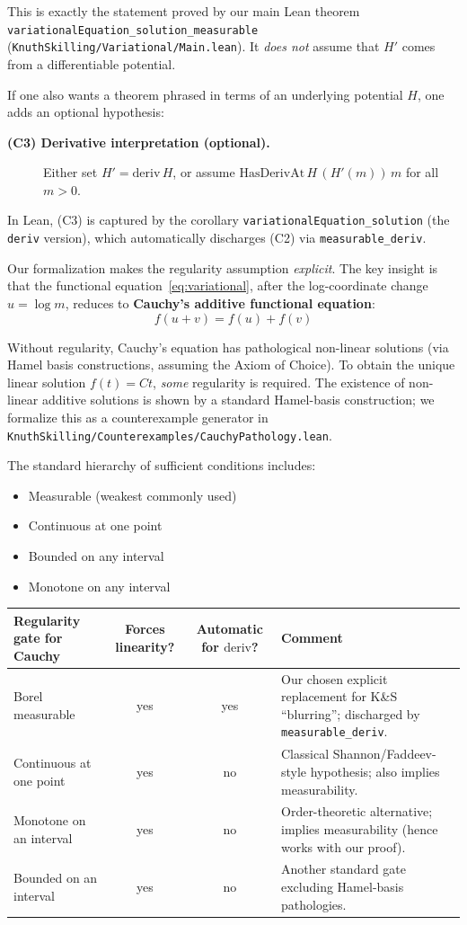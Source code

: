 \documentclass[11pt]{article}
\theoremstyle{definition}
\theoremstyle{remark}
\begin{document}
This is exactly the statement proved by our main Lean theorem
\texttt{variationalEquation\_solution\_measurable}
(\texttt{KnuthSkilling/Variational/Main.lean}).
It \emph{does not} assume that $H'$ comes from a differentiable potential.

If one also wants a theorem phrased in terms of an underlying potential $H$, one adds an optional hypothesis:
\begin{description}
\item[\textbf{(C3) Derivative interpretation (optional).}] Either set $H'=\mathrm{deriv}\,H$, or assume
  $\mathrm{HasDerivAt}\,H\,(H'(m))\,m$ for all $m>0$.
\end{description}
In Lean, (C3) is captured by the corollary \texttt{variationalEquation\_solution} (the \texttt{deriv} version), which
automatically discharges (C2) via \texttt{measurable\_deriv}.

Our formalization makes the regularity assumption \emph{explicit}.
The key insight is that the functional equation~\eqref{eq:variational}, after the log-coordinate change $u = \log m$, reduces to \textbf{Cauchy's additive functional equation}:
\[f(u + v) = f(u) + f(v)\]

Without regularity, Cauchy's equation has pathological non-linear solutions (via Hamel basis constructions, assuming the Axiom of Choice).
To obtain the unique linear solution $f(t) = Ct$, \emph{some} regularity is required.
The existence of non-linear additive solutions is shown by a standard Hamel-basis construction; we formalize this as a counterexample generator in \texttt{KnuthSkilling/Counterexamples/CauchyPathology.lean}.

The standard hierarchy of sufficient conditions includes:
\begin{itemize}
\item Measurable (weakest commonly used)
\item Continuous at one point
\item Bounded on any interval
\item Monotone on any interval
\end{itemize}

\begin{center}
\begin{tabular}{|l|c|c|p{6.2cm}|}
\hline
\textbf{Regularity gate for Cauchy} & \textbf{Forces linearity?} & \textbf{Automatic for $\mathrm{deriv}$?} & \textbf{Comment} \\
\hline
Borel measurable & yes & yes & Our chosen explicit replacement for K\&S ``blurring''; discharged by \texttt{measurable\_deriv}. \\
\hline
Continuous at one point & yes & no & Classical Shannon/Faddeev-style hypothesis; also implies measurability. \\
\hline
Monotone on an interval & yes & no & Order-theoretic alternative; implies measurability (hence works with our proof). \\
\hline
Bounded on an interval & yes & no & Another standard gate excluding Hamel-basis pathologies. \\
\hline
\end{tabular}
\end{center}
\end{document}
